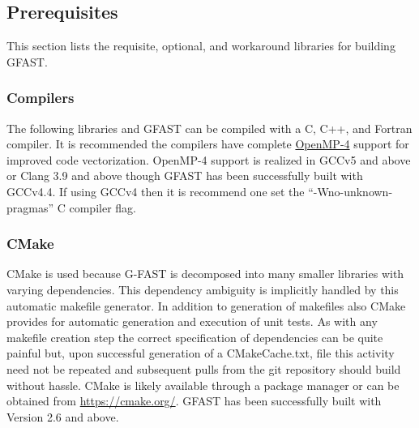 \documentclass[12pt]{article}
\begin{document}
\subsection{Prerequisites}
This section lists the requisite, optional, and workaround libraries for building GFAST.   

\subsubsection{Compilers} 
The following libraries and GFAST can be compiled with a 
C, C++, and Fortran compiler.  It is recommended the compilers have complete 
\href{http://openmp.org/wp/}{OpenMP-4} support for improved code vectorization.  
OpenMP-4 support is realized in GCCv5 and above or Clang 3.9 and above though GFAST has
been successfully built with GCCv4.4.  If using GCCv4 then it is
recommend one set the ``-Wno-unknown-pragmas'' C compiler flag.

\subsubsection{CMake} CMake is used because G-FAST is decomposed into many smaller libraries with 
varying dependencies.  This dependency ambiguity is implicitly handled by this automatic 
makefile generator. In addition to generation of makefiles also CMake provides for automatic generation
and execution of unit tests. As with any makefile creation step the correct 
specification of dependencies can be quite painful but, upon successful generation of a
CMakeCache.txt, file this activity need not be repeated and subsequent pulls from the git
repository should build without hassle.  CMake is likely available through a package manager
or can be obtained from \url{https://cmake.org/}.  GFAST has been successfully built with
Version 2.6 and above.  
\end{document}
